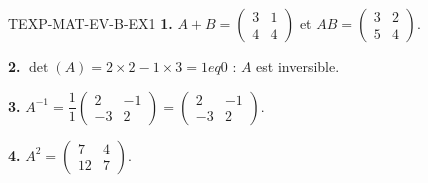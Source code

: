 \begin{corrige}{TEXP-MAT-EV-B-EX1}
\textbf{1.} $A+B=\begin{pmatrix}3&1\\4&4\end{pmatrix}$ et $AB=\begin{pmatrix}3&2\\5&4\end{pmatrix}$.

\textbf{2.} $\det(A)=2\times2-1\times3=1
eq0$ : $A$ est inversible.

\textbf{3.} $A^{-1}=\dfrac{1}{1}\begin{pmatrix}2&-1\\-3&2\end{pmatrix}=\begin{pmatrix}2&-1\\-3&2\end{pmatrix}$.

\textbf{4.} $A^2=\begin{pmatrix}7&4\\12&7\end{pmatrix}$.
\end{corrige}

